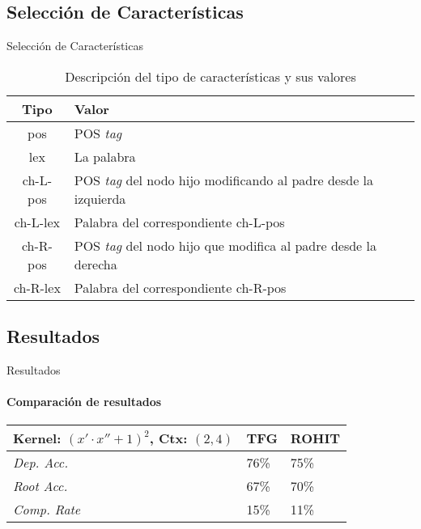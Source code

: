 \documentclass[utf8]{beamer}
\begin{document}
\subsection{Selección de Características}
\begin{frame}{Selección de Características}
\begin{table}[b!]
  \caption{Descripción del tipo de características y sus valores}
  
  \begin{tabularx}{\textwidth}{cp{}}
    \toprule
    Tipo     & Valor                                                                \\
    \toprule
    pos      & POS \emph{tag}                                                       \\
    lex      & La palabra                                                           \\
    ch-L-pos & POS \emph{tag} del nodo hijo modificando al padre desde la izquierda \\
    ch-L-lex & Palabra del correspondiente ch-L-pos                                 \\
    ch-R-pos & POS \emph{tag} del nodo hijo que modifica al padre desde la derecha  \\
    ch-R-lex & Palabra del correspondiente ch-R-pos                                 \\
    \bottomrule
  \end{tabularx}
\end{table}  
\end{frame}


\subsection{Resultados}


\begin{frame}{Resultados}
  \framesubtitle{Comparación de resultados}
  \begin{table}[b!]
  \begin{tabularx}{.82\textwidth}{p{}|p{}p{}}
    Kernel: $(x'\cdot x'' + 1)^2$, Ctx: $(2,4)$ & TFG & ROHIT \\
    \toprule
    \emph{Dep. Acc.}  & 76\%   & 75\% \\
    \emph{Root Acc.}  & 67\%   & 70\% \\
    \emph{Comp. Rate} & 15\%   & 11\% \\
    \bottomrule
  \end{tabularx}
  \end{table}
\end{frame}
\end{document}
